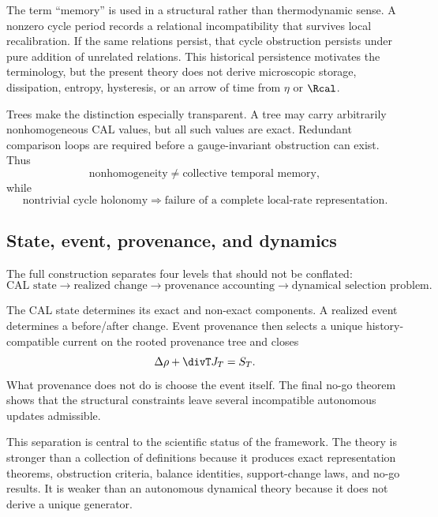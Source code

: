 The term ``memory'' is used in a structural rather than thermodynamic sense. A nonzero cycle period records a relational incompatibility that survives local recalibration. If the same relations persist, that cycle obstruction persists under pure addition of unrelated relations. This historical persistence motivates the terminology, but the present theory does not derive microscopic storage, dissipation, entropy, hysteresis, or an arrow of time from $\eta$ or $\Rcal$.

Trees make the distinction especially transparent. A tree may carry arbitrarily nonhomogeneous CAL values, but all such values are exact. Redundant comparison loops are required before a gauge-invariant obstruction can exist. Thus
\begin{equation}
\boxed{
\text{nonhomogeneity}\neq\text{collective temporal memory},
}
\end{equation}
while
\begin{equation}
\boxed{
\text{nontrivial cycle holonomy}
\Longrightarrow
\text{failure of a complete local-rate representation}.
}
\end{equation}

\subsection{State, event, provenance, and dynamics}

The full construction separates four levels that should not be conflated:
\begin{equation}
\text{CAL state}
\longrightarrow
\text{realized change}
\longrightarrow
\text{provenance accounting}
\longrightarrow
\text{dynamical selection problem}.
\label{eq:four-levels}
\end{equation}

The CAL state determines its exact and non-exact components. A realized event determines a before/after change. Event provenance then selects a unique history-compatible current on the rooted provenance tree and closes
\begin{equation}
\Delta\rho+\divT J_T=S_T.
\end{equation}
What provenance does not do is choose the event itself. The final no-go theorem shows that the structural constraints leave several incompatible autonomous updates admissible.

This separation is central to the scientific status of the framework. The theory is stronger than a collection of definitions because it produces exact representation theorems, obstruction criteria, balance identities, support-change laws, and no-go results. It is weaker than an autonomous dynamical theory because it does not derive a unique generator.

